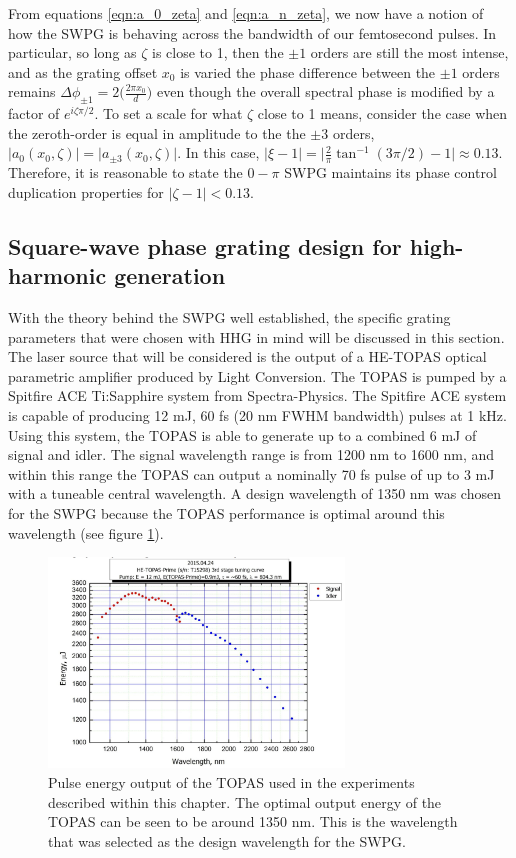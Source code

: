 From equations \ref{eqn:a_0_zeta} and \ref{eqn:a_n_zeta}, we now have a notion of how the SWPG is behaving across the bandwidth of our femtosecond pulses.  In particular, so long as $\zeta$ is close to 1, then the $\pm1$ orders are still the most intense, and as the grating offset $x_0$ is varied the phase difference between the $\pm1$ orders remains $\Delta\phi_{\pm1}=2\bigg(\frac{2\pi x_0}{d}\bigg)$ even though the overall spectral phase is modified by a factor of $e^{i\zeta\pi/2}$.  To set a scale for what $\zeta$ close to 1 means, consider the case when the zeroth-order is equal in amplitude to the the $\pm3$ orders, $\rvert a_0(x_0,\zeta)\rvert = \rvert a_{\pm3}(x_0,\zeta)\rvert$.  In this case, $\rvert \xi - 1\rvert=\rvert\frac{2}{\pi}\tan^{-1}(3\pi/2)-1\rvert\approx0.13$.  Therefore, it is reasonable to state the $0-\pi$ SWPG maintains its phase control duplication properties for $\rvert\zeta - 1\rvert<0.13$.

\subsection{Square-wave phase grating design for high-harmonic generation}
With the theory behind the SWPG well established, the specific grating parameters that were chosen with HHG in mind will be discussed in this section.  The laser source that will be considered is the output of a HE-TOPAS optical parametric amplifier produced by Light Conversion.  The TOPAS is pumped by a Spitfire ACE Ti:Sapphire system from Spectra-Physics.  The Spitfire ACE system is capable of producing  12 mJ, 60 fs (20 nm FWHM bandwidth) pulses at 1 kHz.  Using this system, the TOPAS is able to generate up to a combined 6 mJ of signal and idler. The signal wavelength range is from 1200 nm to 1600 nm, and within this range the TOPAS can output a nominally 70 fs pulse of up to 3 mJ with a tuneable central wavelength.  A design wavelength of 1350 nm was chosen for the SWPG because the TOPAS performance is optimal around this wavelength (see figure \ref{fig:TOPAS_output}).
\begin{figure}
	\centering
	\includegraphics[width=0.7\textwidth]{figures/TOPAS/Topas_output.png}
	\caption[Pulse energy output of HE-TOPAS at various wavelengths]{Pulse energy output of the TOPAS used in the experiments described within this chapter.  The optimal output energy of the TOPAS can be seen to be around 1350 nm.  This is the wavelength that was selected as the design wavelength for the SWPG.}
	\label{fig:TOPAS_output}
\end{figure}

